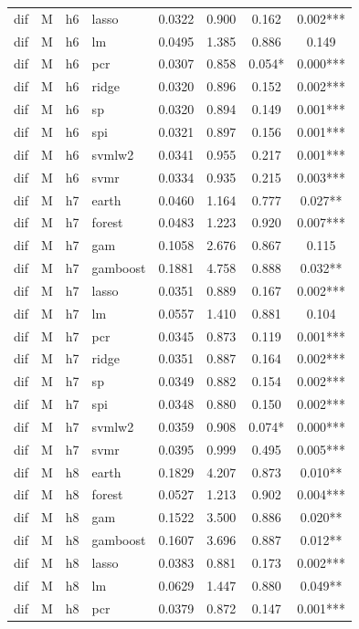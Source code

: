 \begin{ThreePartTable}
\begin{longtable}[t]{llclcccc}
dif & M & h6 & lasso & 0.0322 & 0.900 & 0.162 & 0.002***\\
dif & M & h6 & lm & 0.0495 & 1.385 & 0.886 & 0.149\\
dif & M & h6 & pcr & 0.0307 & 0.858 & 0.054* & 0.000***\\
dif & M & h6 & ridge & 0.0320 & 0.896 & 0.152 & 0.002***\\
dif & M & h6 & sp & 0.0320 & 0.894 & 0.149 & 0.001***\\
dif & M & h6 & spi & 0.0321 & 0.897 & 0.156 & 0.001***\\
dif & M & h6 & svmlw2 & 0.0341 & 0.955 & 0.217 & 0.001***\\
dif & M & h6 & svmr & 0.0334 & 0.935 & 0.215 & 0.003***\\
\addlinespace
dif & M & h7 & earth & 0.0460 & 1.164 & 0.777 & 0.027**\\
dif & M & h7 & forest & 0.0483 & 1.223 & 0.920 & 0.007***\\
dif & M & h7 & gam & 0.1058 & 2.676 & 0.867 & 0.115\\
dif & M & h7 & gamboost & 0.1881 & 4.758 & 0.888 & 0.032**\\
dif & M & h7 & lasso & 0.0351 & 0.889 & 0.167 & 0.002***\\
dif & M & h7 & lm & 0.0557 & 1.410 & 0.881 & 0.104\\
dif & M & h7 & pcr & 0.0345 & 0.873 & 0.119 & 0.001***\\
dif & M & h7 & ridge & 0.0351 & 0.887 & 0.164 & 0.002***\\
dif & M & h7 & sp & 0.0349 & 0.882 & 0.154 & 0.002***\\
dif & M & h7 & spi & 0.0348 & 0.880 & 0.150 & 0.002***\\
dif & M & h7 & svmlw2 & 0.0359 & 0.908 & 0.074* & 0.000***\\
dif & M & h7 & svmr & 0.0395 & 0.999 & 0.495 & 0.005***\\
\addlinespace
dif & M & h8 & earth & 0.1829 & 4.207 & 0.873 & 0.010**\\
dif & M & h8 & forest & 0.0527 & 1.213 & 0.902 & 0.004***\\
dif & M & h8 & gam & 0.1522 & 3.500 & 0.886 & 0.020**\\
dif & M & h8 & gamboost & 0.1607 & 3.696 & 0.887 & 0.012**\\
dif & M & h8 & lasso & 0.0383 & 0.881 & 0.173 & 0.002***\\
dif & M & h8 & lm & 0.0629 & 1.447 & 0.880 & 0.049**\\
dif & M & h8 & pcr & 0.0379 & 0.872 & 0.147 & 0.001***\\

\end{longtable}
\end{ThreePartTable}
